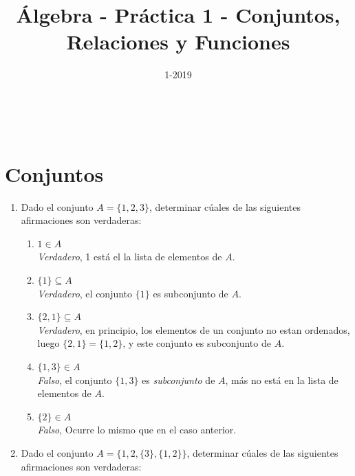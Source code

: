 \documentclass[a4paper,10pt]{article}
\title{\'Algebra - Pr\'actica 1 - Conjuntos, Relaciones y Funciones}
\author{}
\date{1-2019}
\makeatletter
\renewcommand{\maketitle}{
\begin{center}
\begin{normalsize}\textbf{\@title}\end{normalsize}\\
\begin{normalsize}\@author\end{normalsize}
\end{center}
}
\makeatother
\begin{document}
\renewcommand{\headrulewidth}{0pt} 			%
\renewcommand{\tablename}{Tabla}
\renewcommand{\figurename}{Fig.}
\renewcommand{\refname}{Bibliograf\'ia y referencias}
\renewcommand{\contentsname}{Tabla de contenido}
\maketitle
\section*{Conjuntos}
    \begin{enumerate}
        \item Dado el conjunto $A=\{1,2,3\}$, determinar c\'uales de las siguientes afirmaciones son verdaderas:
        \begin{enumerate}[label = \roman*)]
            \item $1\in A$\\
                \colorbox{g}{\textit{Verdadero}}, 1 est\'a el la lista de elementos de $A$.\\
            \item $\{1\}\subseteq A$\\
                \colorbox{g}{\textit{Verdadero}}, el conjunto $\{1\}$ es subconjunto de $A$.\\
            \item $\{2,1\}\subseteq A$\\
                \colorbox{g}{\textit{Verdadero}}, en principio, los elementos de un conjunto no estan ordenados, luego $\{2,1\}=\{1,2\}$, y este conjunto es subconjunto de $A$.\\
            \item $\{1,3\}\in A$\\
                \colorbox{g}{\textit{Falso}}, el conjunto $\{1,3\}$ es \textit{subconjunto} de $A$, m\'as no est\'a en la lista de elementos de $A$.\\
            \item $\{2\}\in A$\\
                \colorbox{g}{\textit{Falso}}, Ocurre lo mismo que en el caso anterior.
        \end{enumerate}
        \item Dado el conjunto $A = \{1,2,\{3\},\{1,2\}\} $, determinar c\'uales de las siguientes afirmaciones son verdaderas:
        \begin{enumerate}[label = \roman*)]

\end{enumerate}
\end{enumerate}
\end{document}
